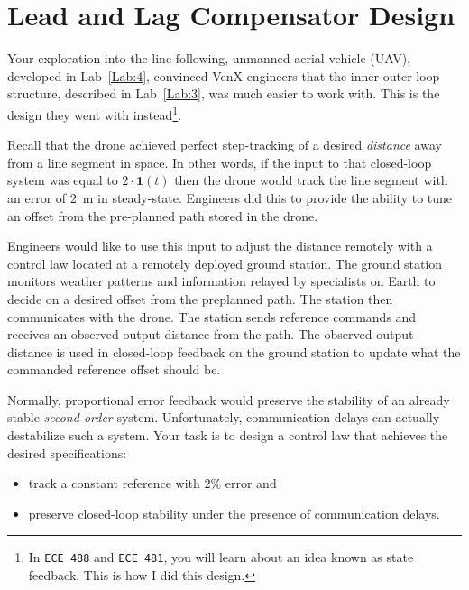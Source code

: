 \chapter{Lead and Lag Compensator Design}\label{Lab:5}
Your exploration into the line-following, unmanned aerial vehicle (UAV), developed in Lab~\ref{Lab:4}, convinced VenX engineers that the inner-outer loop structure, described in Lab~\ref{Lab:3}, was much easier to work with.
This is the design they went with instead\footnote{In \texttt{ECE 488} and \texttt{ECE 481}, you will learn about an idea known as state feedback. This is how I did this design.}.
%
\begin{center}
  
\end{center}
%
Recall that the drone achieved perfect step-tracking of a desired \emph{distance} away from a line segment in space.
In other words, if the input to that closed-loop system was equal to \(2 \cdot \mathbf{1}(t)\) then the drone would track the line segment with an error of \SI{2}{\meter} in steady-state.
Engineers did this to provide the ability to tune an offset from the pre-planned path stored in the drone.

Engineers would like to use this input to adjust the distance remotely with a control law located at a remotely deployed ground station.
The ground station monitors weather patterns and information relayed by specialists on Earth to decide on a desired offset from the preplanned path.
The station then communicates with the drone.
The station sends reference commands and receives an observed output distance from the path.
The observed output distance is used in closed-loop feedback on the ground station to update what the commanded reference offset should be.

Normally, proportional error feedback would preserve the stability of an already stable \emph{second-order} system.
Unfortunately, communication delays can actually destabilize such a system.
Your task is to design a control law that achieves the desired specifications:
\begin{itemize}
  \item{track a constant reference with \(2\%\) error and}
  \item{preserve closed-loop stability under the presence of communication delays.}
\end{itemize}

